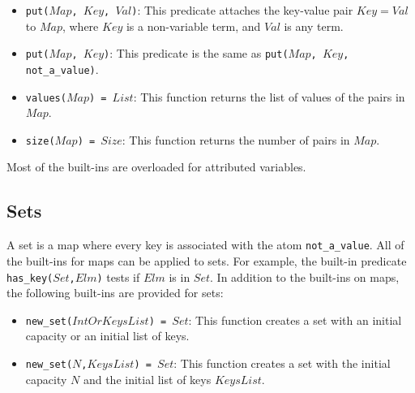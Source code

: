 \begin{itemize}
\item \texttt{put($Map$, $Key$, $Val$)}: This predicate attaches the key-value pair \texttt{$Key$$=$$Val$} to \texttt{$Map$}, where \texttt{$Key$} is a non-variable term, and \texttt{$Val$} is any term. 
\item \texttt{put($Map$, $Key$)}: This predicate is the same as \texttt{put($Map$, $Key$, not\_a\_value)}.
\item \texttt{values($Map$) = $List$}: This function returns the list of values of the pairs in $Map$.
\item \texttt{size($Map$) = $Size$}: This function returns the number of pairs in $Map$.
\end{itemize}
Most of the built-ins are overloaded for attributed variables.

\subsection{Sets}
A set is a map where every key is associated with the atom \texttt{not\_a\_value}. All of the built-ins for maps can be applied to sets. For example, the built-in predicate \texttt{has\_key($Set$,$Elm$)} tests if $Elm$ is in $Set$. In addition to the built-ins on maps, the following built-ins are provided for sets:
\begin{itemize}
\item \texttt{new\_set($IntOrKeysList$) = $Set$}: This function creates a set with an initial capacity or an initial list of keys.
\item \texttt{new\_set($N$,$KeysList$) = $Set$}: This function creates a set with the initial capacity $N$ and the initial list of keys $KeysList$.
\end{itemize}

